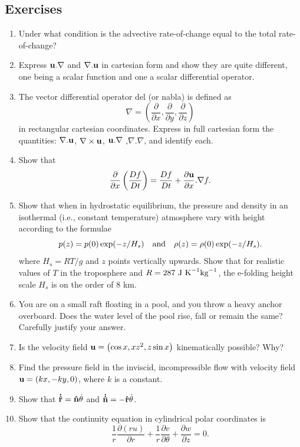 \documentclass[twoside,a4paper,11pt]{report}
\begin{document}
\subsection*{Exercises}
\begin{enumerate}
\item Under what condition is the advective rate-of-change equal to the total 
rate-of-change?

\item Express ${\bf u}. \nabla$ and $\nabla . {\bf u}$ in cartesian form and show 
they are quite different, one being a scalar function and one a scalar 
differential operator.

\item The vector differential operator del (or nabla) is defined as
\[
\nabla =\left( {\frac{\partial }{\partial x},\frac{\partial }{\partial 
y},\frac{\partial }{\partial z}} \right)
\]
in rectangular cartesian coordinates. Express in full cartesian form the 
quantities: $\nabla . {\bf u}$, $\nabla \times {\bf u}$, ${\bf u}. \nabla $
,$\nabla . \nabla $, and identify each.

\item Show that 
\[\frac{\partial }{\partial x}\left( {\frac{Df}{Dt}} 
\right)=\frac{Df}{Dt}+\frac{\partial {{\bf u}}}{\partial x}. \nabla 
f. \]

\item Show that when in hydrostatic equilibrium, the pressure and density in an 
isothermal (i.e., constant temperature) atmosphere vary with height 
according to the formulae 
\[ p(z)=p(0)\exp (-z/H_s ) \quad \hbox{and}\quad \rho (z)=\rho 
(0)\exp (-z/H_s ). \]
 where $H_s ={RT/ g}$ and $z$ points vertically upwards. Show 
that for realistic values of $T$ in the troposphere and $R=287 \hbox{ J
K}^{-1}\hbox{kg}^{-1}$, the e-folding height
scale $H_{s}$ is on the order of 8 km.

\item You are on a small raft floating in a pool, and you throw a heavy anchor 
overboard. Does the water level of the pool rise, fall or remain the same? 
Carefully justify your answer.

\item Is the velocity field ${{\bf u}}=\left( {\cos x,xz^2,z\sin x} 
\right)$ kinematically possible? Why?

\item Find the pressure field in the inviscid, incompressible flow with 
velocity field ${{\bf u}}=\left( {kx,-ky,0} \right)$, where $k$ is a 
constant.

\item Show that ${{\bf \dot {\hat {r}}}}={{\bf \hat 
{n}}}\dot {\theta }$ and ${{\bf \dot {\hat {n}}}}=-{{\bf 
\hat {r}}}\dot {\theta }$.

\item Show that the continuity equation in cylindrical polar coordinates is
\[
\frac{1}{r}\frac{\partial \left( {ru} \right)}{\partial 
r}+\frac{1}{r}\frac{\partial v}{\partial \theta 
}+\frac{\partial w}{\partial z}=0.
\]
\end{enumerate}
\end{document}
